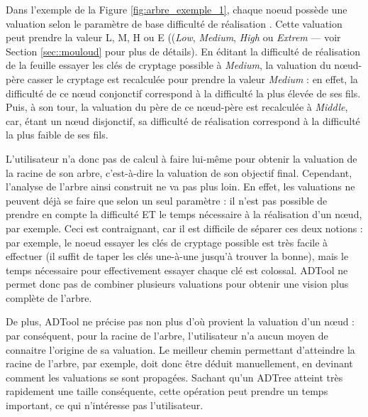 	Dans l'exemple de la {\sc Figure} \ref{fig:arbre_exemple_1}, chaque noeud possède une valuation selon le paramètre de base \og difficulté de réalisation \fg{}. Cette valuation peut prendre la valeur L, M, H ou E ((\emph{Low}, \emph{Medium}, \emph{High} ou \emph{Extrem} --- voir Section \ref{sec::mouloud} pour plus de détails). En éditant la difficulté de réalisation de la feuille \og essayer les clés de cryptage possible \fg{}  à \emph{Medium}, la valuation du nœud-père \og casser le cryptage \fg{} est recalculée pour prendre la valeur \emph{Medium} : en effet, la difficulté de ce nœud conjonctif correspond à la difficulté la plus élevée de ses fils. Puis, à son tour, la valuation du père de ce nœud-père est recalculée à \emph{Middle}, car, étant un nœud disjonctif, sa difficulté de réalisation correspond à la difficulté la plus faible de ses fils.
	
	L'utilisateur n'a donc pas de calcul à faire lui-même pour obtenir la valuation de la racine de son arbre, c'est-à-dire la valuation de son objectif final. Cependant, l'analyse de l'arbre ainsi construit ne va pas plus loin. En effet, les valuations ne peuvent déjà se faire que selon un seul paramètre : il n'est pas possible de prendre en compte la \og difficulté \fg{} ET le \og temps nécessaire \fg{} à la réalisation d'un nœud, par exemple. Ceci est contraignant, car il est difficile de séparer ces deux notions : par exemple, le noeud \og essayer les clés de cryptage possible \fg{} est très facile à effectuer (il suffit de taper les clés une-à-une jusqu'à trouver la bonne), mais le temps nécessaire pour effectivement essayer chaque clé est colossal. ADTool ne permet donc pas de combiner plusieurs valuations pour obtenir une vision plus complète de l'arbre.
	
	 De plus, ADTool ne précise pas non plus d'où provient la valuation d'un nœud : par conséquent, pour la racine de l'arbre, l'utilisateur n'a aucun moyen de connaitre l'origine de sa valuation. Le \og meilleur chemin \fg{} permettant d'atteindre la racine de l'arbre, par exemple, doit donc être déduit manuellement, en devinant comment les valuations se sont propagées. Sachant qu'un ADTree atteint très rapidement une taille conséquente, cette opération peut prendre un temps important, ce qui n'intéresse pas l'utilisateur.
	 
	 
	 
	 